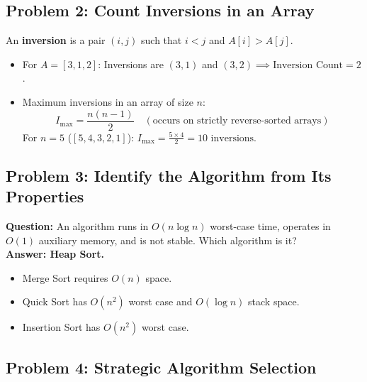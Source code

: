 \subsection{Problem 2: Count Inversions in an Array}
An \textbf{inversion} is a pair $(i, j)$ such that $i < j$ and $A[i] > A[j]$.
\begin{itemize}
    \item For $A = [3, 1, 2]$: Inversions are $(3, 1)$ and $(3, 2) \implies \boxed{\text{Inversion Count} = 2}$.
    \item Maximum inversions in an array of size $n$:
    \[
    \boxed{I_{\max} = \frac{n(n-1)}{2}} \quad (\text{occurs on strictly reverse-sorted arrays})
    \]
    For $n = 5$ ($[5, 4, 3, 2, 1]$): $I_{\max} = \frac{5 \times 4}{2} = \boxed{10 \text{ inversions}}$.
\end{itemize}

\subsection{Problem 3: Identify the Algorithm from Its Properties}
\textbf{Question:} An algorithm runs in $O(n \log n)$ worst-case time, operates in $O(1)$ auxiliary memory, and is not stable. Which algorithm is it?\\
\textbf{Answer: Heap Sort.}
\begin{itemize}
    \item Merge Sort requires $O(n)$ space.
    \item Quick Sort has $O(n^2)$ worst case and $O(\log n)$ stack space.
    \item Insertion Sort has $O(n^2)$ worst case.
\end{itemize}

\subsection{Problem 4: Strategic Algorithm Selection}

